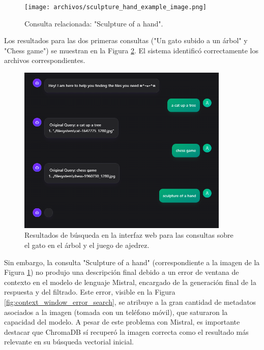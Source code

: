 \begin{figure}[H]
\centering
\texttt{[image: archivos/sculpture\_hand\_example\_image.png]}
\caption[Imagen de una escultura de una mano]{Consulta relacionada: "Sculpture of a hand".}
\label{fig:search_hand_sculpture}
\end{figure}

Los resultados para las dos primeras consultas ("Un gato subido a un árbol" y "Chess game") se muestran en la Figura \ref{fig:web_search_results_cat_chess}. El sistema identificó correctamente los archivos correspondientes.

\begin{figure}[H]
\centering
\includegraphics[width=0.9\textwidth]{archivos/web_multiple_results.png}
\caption[Resultados de búsqueda para gato y ajedrez]{Resultados de búsqueda en la interfaz web para las consultas sobre el gato en el árbol y el juego de ajedrez.}
\label{fig:web_search_results_cat_chess}
\end{figure}

Sin embargo, la consulta "Sculpture of a hand" (correspondiente a la imagen de la Figura \ref{fig:search_hand_sculpture}) no produjo una descripción final debido a un error de ventana de contexto en el modelo de lenguaje Mistral, encargado de la generación final de la respuesta y del filtrado. Este error, visible en la Figura \ref{fig:context_window_error_search}, se atribuye a la gran cantidad de metadatos asociados a la imagen (tomada con un teléfono móvil), que saturaron la capacidad del modelo. A pesar de este problema con Mistral, es importante destacar que ChromaDB sí recuperó la imagen correcta como el resultado más relevante en su búsqueda vectorial inicial.

